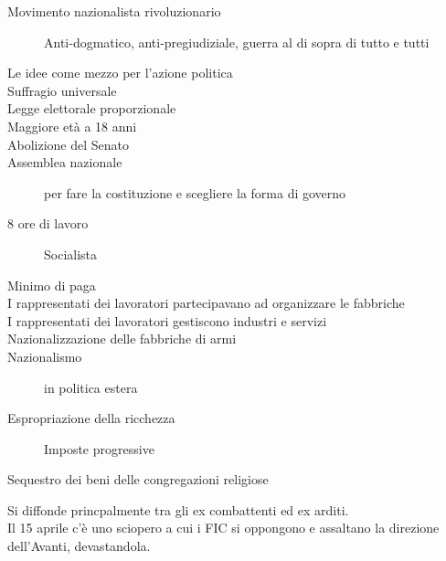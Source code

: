 \begin{description}
  \item[Movimento nazionalista rivoluzionario] Anti-dogmatico, anti-pregiudiziale, guerra al di sopra
    di tutto e tutti
  \item[Le idee come mezzo per l'azione politica]
  \item[Suffragio universale]
  \item[Legge elettorale proporzionale]
  \item[Maggiore età a 18 anni]
  \item[Abolizione del Senato]
  \item[Assemblea nazionale] per fare la costituzione e scegliere la forma di governo
  \item[8 ore di lavoro] Socialista
  \item[Minimo di paga]
  \item[I rappresentati dei lavoratori partecipavano ad organizzare le fabbriche]
  \item[I rappresentati dei lavoratori gestiscono industri e servizi]
  \item[Nazionalizzazione delle fabbriche di armi]
  \item[Nazionalismo] in politica estera
  \item[Espropriazione della ricchezza] Imposte progressive
  \item[Sequestro dei beni delle congregazioni religiose]
\end{description}
Si diffonde princpalmente tra gli ex combattenti ed ex arditi.\\ [\baselineskip]
Il 15 aprile c'è uno sciopero a cui i FIC si oppongono e assaltano la direzione dell'Avanti, 
devastandola.

